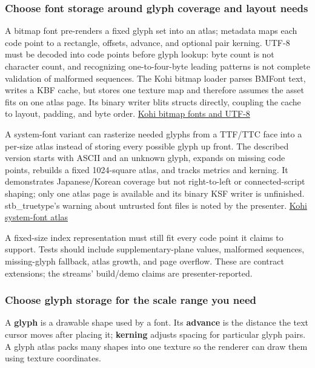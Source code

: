 \subsubsection{Choose font storage around glyph coverage and layout needs}\label{06-engine-ii-ch026-choose-font-storage-around-glyph-coverage-and-layout-needs}

A bitmap font pre-renders a fixed glyph set into an atlas; metadata maps each code point to a rectangle, offsets, advance, and optional pair kerning. UTF-8 must be decoded into code points before glyph lookup: byte count is not character count, and recognizing one-to-four-byte leading patterns is not complete validation of malformed sequences. The Kohi bitmap loader parses BMFont text, writes a KBF cache, but stores one texture map and therefore assumes the asset fits on one atlas page. Its binary writer blits structs directly, coupling the cache to layout, padding, and byte order. \href{https://www.youtube.com/watch?v=zvGIp-S2mxA}{Kohi bitmap fonts and UTF-8}

A system-font variant can rasterize needed glyphs from a TTF/TTC face into a per-size atlas instead of storing every possible glyph up front. The described version starts with ASCII and an unknown glyph, expands on missing code points, rebuilds a fixed 1024-square atlas, and tracks metrics and kerning. It demonstrates Japanese/Korean coverage but not right-to-left or connected-script shaping; only one atlas page is available and its binary KSF writer is unfinished. stb\_truetype's warning about untrusted font files is noted by the presenter. \href{https://www.youtube.com/watch?v=ek_37ALWCqU}{Kohi system-font atlas}

A fixed-size index representation must still fit every code point it claims to support. Tests should include supplementary-plane values, malformed sequences, missing-glyph fallback, atlas growth, and page overflow. These are contract extensions; the streams' build/demo claims are presenter-reported.

\subsubsection{Choose glyph storage for the scale range you need}\label{06-engine-ii-ch026-choose-glyph-storage-for-the-scale-range-you-need}

A \textbf{glyph} is a drawable shape used by a font. Its \textbf{advance} is the distance the text cursor moves after placing it; \textbf{kerning} adjusts spacing for particular glyph pairs. A glyph atlas packs many shapes into one texture so the renderer can draw them using texture coordinates.

